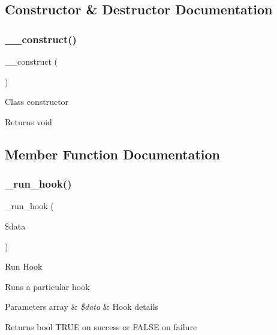 \subsection{Constructor \& Destructor Documentation}
\mbox{\label{class_c_i___hooks_a095c5d389db211932136b53f25f39685}} 
\subsubsection{\texorpdfstring{\+\_\+\+\_\+construct()}{\_\_construct()}}
{\footnotesize\ttfamily \+\_\+\+\_\+construct (\begin{DoxyParamCaption}{ }\end{DoxyParamCaption})}

Class constructor

\begin{DoxyReturn}{Returns}
void 
\end{DoxyReturn}


\subsection{Member Function Documentation}
\mbox{\label{class_c_i___hooks_a2cd07b3fcfaf153a37f164d3fbc7c3d9}} 
\subsubsection{\texorpdfstring{\+\_\+run\+\_\+hook()}{\_run\_hook()}}
{\footnotesize\ttfamily \+\_\+run\+\_\+hook (\begin{DoxyParamCaption}\item[{}]{\$data }\end{DoxyParamCaption})\hspace{0.3cm}{\ttfamily [protected]}}

Run Hook

Runs a particular hook


\begin{DoxyParams}[1]{Parameters}
array & {\em \$data} & Hook details \\
\hline
\end{DoxyParams}
\begin{DoxyReturn}{Returns}
bool T\+R\+UE on success or F\+A\+L\+SE on failure 
\end{DoxyReturn}
\mbox{\label{class_c_i___hooks_a470d397aaf24f1ca3ef73021ad03492b}} 
